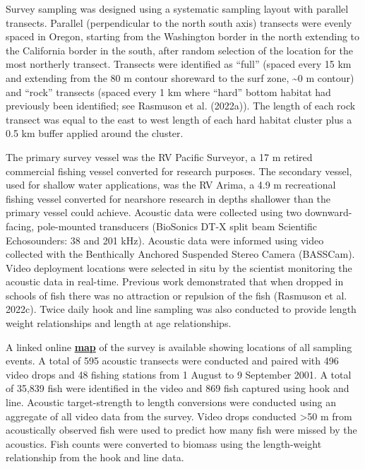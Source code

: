 \documentclass[11pt,
  letterpaper,
]{article}
\begin{document}
Survey sampling was designed using a systematic sampling layout with parallel transects. Parallel (perpendicular to the north south axis) transects were evenly spaced in Oregon, starting from the Washington border in the north extending to the California border in the south, after random selection of the location for the most northerly transect. Transects were identified as ``full'' (spaced every 15 km and extending from the 80 m contour shoreward to the surf zone, \textasciitilde0 m contour) and ``rock'' transects (spaced every 1 km where ``hard'' bottom habitat had previously been identified; see Rasmuson et al. (2022a)). The length of each rock transect was equal to the east to west length of each hard habitat cluster plus a 0.5 km buffer applied around the cluster.

The primary survey vessel was the RV Pacific Surveyor, a 17 m retired commercial fishing vessel converted for research purposes. The secondary vessel, used for shallow water applications, was the RV Arima, a 4.9 m recreational fishing vessel converted for nearshore research in depths shallower than the primary vessel could achieve. Acoustic data were collected using two downward-facing, pole-mounted transducers (BioSonics DT-X split beam Scientific Echosounders: 38 and 201 kHz). Acoustic data were informed using video collected with the Benthically Anchored Suspended Stereo Camera (BASSCam). Video deployment locations were selected in situ by the scientist monitoring the acoustic data in real-time. Previous work demonstrated that when dropped in schools of fish there was no attraction or repulsion of the fish (Rasmuson et al. 2022c). Twice daily hook and line sampling was also conducted to provide length weight relationships and length at age relationships.

A linked online \href{https://www.arcgis.com/apps/mapviewer/index.html?webmap=49e8f3a8079448c29a21d4384d2b50dd}{{\textbf{map}}} of the survey is available showing locations of all sampling events. A total of 595 acoustic transects were conducted and paired with 496 video drops and 48 fishing stations from 1 August to 9 September 2001. A total of 35,839 fish were identified in the video and 869 fish captured using hook and line. Acoustic target-strength to length conversions were conducted using an aggregate of all video data from the survey. Video drops conducted \textgreater50 m from acoustically observed fish were used to predict how many fish were missed by the acoustics. Fish counts were converted to biomass using the length-weight relationship from the hook and line data.
\end{document}

